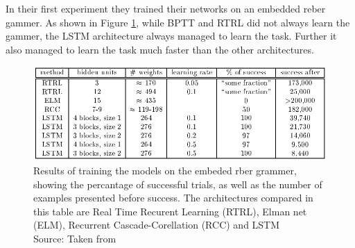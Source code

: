 \documentclass[twoside,a4paper,10pt,DIV=12,BCOR=12mm]{scrartcl}
\begin{document}
In their first experiment they trained their networks on an embedded reber gammer. As shown in Figure \ref{fig:exp1res}, while BPTT and RTRL did not always learn the gammer, the LSTM architecture always managed to learn the task. Further it also managed to learn the task much faster than the other architectures.\cite{hochreiter1997lstm}
\begin{figure}
    \centering
    \includegraphics[width=0.75\linewidth]{ResultsTask1.png}
    \caption{Results of training the models on the embeded rber grammer, showing the percantage of successful trials, as well as the number of examples presented before success. The architectures compared in this table are Real Time Recurent Learning (RTRL), Elman net (ELM), Recurrent Cascade-Corellation (RCC) and LSTM\\Source: Taken from \cite{hochreiter1997lstm}}
    \label{fig:exp1res}
\end{figure}
\end{document}
